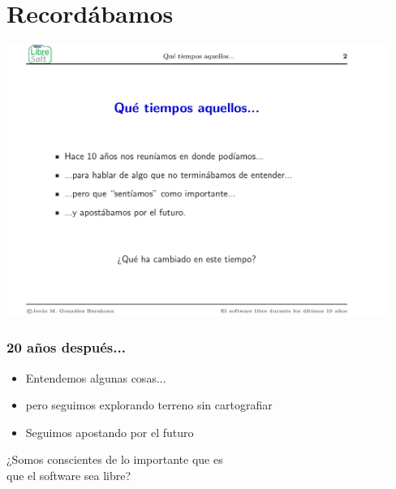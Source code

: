 \documentclass[17pt,aspectratio=169]{beamer}
\begin{document}
\section{Recordábamos}

\begin{frame}

\begin{center}
  \includegraphics[width=12.5cm]{figs/transpas-03}
\end{center}  

\end{frame}

\begin{frame}
\frametitle{20 años después...}

\begin{itemize}
\item Entendemos algunas cosas... \\
\item pero seguimos explorando terreno sin cartografiar
\item Seguimos apostando por el futuro
\end{itemize}  

\begin{center}
  ¿Somos conscientes de lo importante que es \\
  que el software sea libre? \\
\end{center}
\end{frame}
\end{document}
